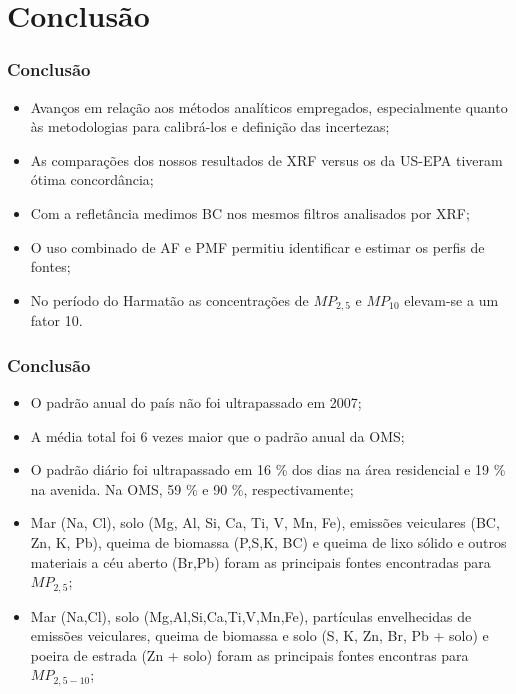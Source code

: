 \section{Conclusão}

\begin{frame}
  \frametitle{Conclusão}
  \begin{itemize}
    \item Avanços em relação aos métodos analíticos empregados, especialmente quanto às metodologias para calibrá-los e definição das incertezas;
    \item As comparações dos nossos resultados de XRF versus os da US-EPA tiveram ótima concordância;
    \item Com a refletância medimos BC nos mesmos filtros analisados por XRF;
    \item O uso combinado de AF e PMF permitiu identificar e estimar os perfis de fontes;
        \item No período do Harmatão as concentrações de $MP_{2,5}$ e $MP_{10}$ elevam-se a um fator 10.
  \end{itemize}
\end{frame}

\begin{frame}
  \frametitle{Conclusão}
  \begin{itemize}
    \item O padrão anual do país não foi ultrapassado em 2007;
    \item A média total foi 6 vezes maior que o padrão anual da OMS;
    \item O padrão diário foi ultrapassado em 16 \% dos dias na área residencial e 19 \% na avenida. Na OMS, 59 \% e 90 \%, respectivamente;
    \item Mar (Na, Cl), solo (Mg, Al, Si, Ca, Ti, V, Mn, Fe), emissões veiculares (BC, Zn, K, Pb), queima de biomassa (P,S,K, BC) e queima de lixo sólido e outros materiais a céu aberto (Br,Pb) foram as principais fontes encontradas para $MP_{2,5}$;
    \item Mar (Na,Cl), solo (Mg,Al,Si,Ca,Ti,V,Mn,Fe), partículas envelhecidas de emissões veiculares, queima de biomassa e solo (S, K, Zn, Br, Pb + solo) e poeira de estrada (Zn + solo) foram as principais fontes encontras para $MP_{2,5-10}$;
  \end{itemize}
\end{frame}

